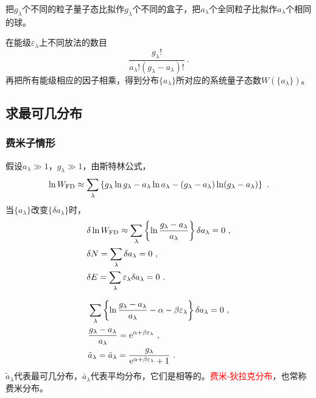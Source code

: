 \documentclass[12pt,a4paper]{article}
\begin{document}
把$g_\lambda$个不同的粒子量子态比拟作$g_\lambda$个不同的盒子，把$a_\lambda$个全同粒子比拟作$a_\lambda$个相同的球。





在能级$ \varepsilon_\lambda$上不同放法的数目
\begin{equation*}
\dfrac{g_\lambda !}{a_\lambda ! (g_\lambda -a_\lambda) !} ~.
\end{equation*}
再把所有能级相应的因子相乘，得到分布$\{ a_\lambda \}$所对应的系统量子态数$W(\{ a_\lambda \})$。



\subsection{求最可几分布}
\subsubsection{费米子情形}
假设$a_\lambda \gg 1$，$g_\lambda \gg 1$，由斯特林公式，
\begin{equation}
\ln W_{\rm FD} \approx \sum_\lambda \left\{g_\lambda \ln g_\lambda - a_\lambda \ln a_\lambda -(g_\lambda -a_\lambda) \ln (g_\lambda -a_\lambda) \right\} ~.
\end{equation}
当$\{ a_\lambda \}$改变$\{\delta a_\lambda \}$时，
\begin{align}
& \delta \ln W_{\rm FD} \approx \sum_\lambda \left\{ \ln \dfrac{g_\lambda - a_\lambda}{a_\lambda} \right\} \delta a_\lambda  = 0 ~, \\
& \delta N  = \sum_\lambda \delta a_\lambda = 0 ~, \\
& \delta E  = \sum_\lambda \varepsilon_\lambda \delta a_\lambda = 0 ~.
\end{align}

\begin{align}
& \sum_\lambda \left\{ \ln \dfrac{g_\lambda - a_\lambda}{a_\lambda} -\alpha -\beta \varepsilon_\lambda \right\} \delta a_\lambda = 0 ~, \\
&  \dfrac{g_\lambda - a_\lambda}{a_\lambda} = {\rm e}^{\alpha +\beta \varepsilon_\lambda} ~, \\
& \tilde{a}_\lambda = \bar{a}_\lambda = \dfrac{g_\lambda}{{\rm e}^{\alpha +\beta \varepsilon_\lambda} +1} ~.
\end{align}
$\tilde{a}_\lambda$代表最可几分布，$\bar{a}_\lambda$代表平均分布，它们是相等的。\textcolor{red}{费米-狄拉克分布}，也常称费米分布。
\end{document}
